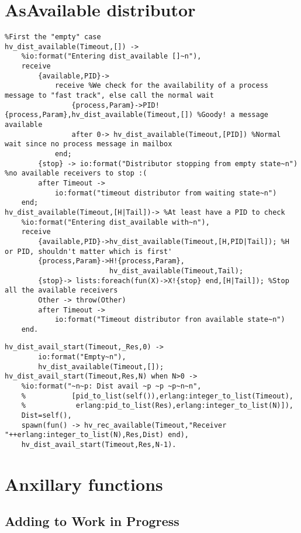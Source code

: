 \section{AsAvailable distributor}
\begin{lstlisting}[name=hvp2]
%The Available distributor
%First the "empty" case
hv_dist_available(Timeout,[]) ->
	%io:format("Entering dist_available []~n"),
	receive
		{available,PID}->
			receive %We check for the availability of a process message to "fast track", else call the normal wait
				{process,Param}->PID!{process,Param},hv_dist_available(Timeout,[]) %Goody! a message available
				after 0-> hv_dist_available(Timeout,[PID]) %Normal wait since no process message in mailbox
			end;
		{stop} -> io:format("Distributor stopping from empty state~n") %no available receivers to stop :(
		after Timeout ->
			io:format("timeout distributor from waiting state~n")
	end;
hv_dist_available(Timeout,[H|Tail])-> %At least have a PID to check
	%io:format("Entering dist_available with~n"),
	receive
		{available,PID}->hv_dist_available(Timeout,[H,PID|Tail]); %H or PID, shouldn't matter which is first'
		{process,Param}->H!{process,Param},
						 hv_dist_available(Timeout,Tail);
		{stop}-> lists:foreach(fun(X)->X!{stop} end,[H|Tail]); %Stop all the available receivers
		Other -> throw(Other)
		after Timeout ->
			io:format("Timeout distributor fron available state~n")
	end.

\end{lstlisting}

\begin{lstlisting}[name=hvp2]
%Start the receivers and the distributor
hv_dist_avail_start(Timeout,_Res,0)	->
		io:format("Empty~n"),
		hv_dist_available(Timeout,[]);
hv_dist_avail_start(Timeout,Res,N) when N>0 ->
	%io:format("~n~p: Dist avail ~p ~p ~p~n~n",
	%			[pid_to_list(self()),erlang:integer_to_list(Timeout),
	%			 erlang:pid_to_list(Res),erlang:integer_to_list(N)]),
	Dist=self(),
	spawn(fun() -> hv_rec_available(Timeout,"Receiver "++erlang:integer_to_list(N),Res,Dist) end),
	hv_dist_avail_start(Timeout,Res,N-1).
\end{lstlisting}

\section{Anxillary functions}
\subsection{Adding to Work in Progress}

